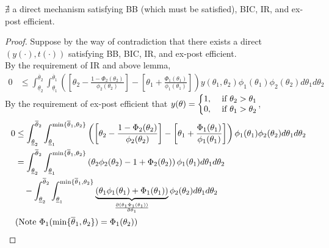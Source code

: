 \documentclass[11pt]{elegantbook}
\begin{document}
\begin{theorem}
    $\nexists$ a direct mechanism satisfying BB (which must be satisfied), BIC, IR, and ex-post efficient.
\end{theorem}
\begin{proof}
    Suppose by the way of contradiction that there exists a direct $(y(\cdot),t(\cdot))$ satisfying BB, BIC, IR, and ex-post efficient.\\
    By the requirement of IR and above lemma,
    \begin{equation}
        \begin{aligned}
            0&\leq \int_{\underline{\theta}_2}^{\overline{\theta}_2}\int_{\underline{\theta}_1}^{\overline{\theta}_1} \left(\left[\theta_2-\frac{1-\Phi_2(\theta_2)}{\phi_2(\theta_2)}\right]-\left[\theta_1+\frac{\Phi_1(\theta_1)}{\phi_1(\theta_1)}\right]\right)y(\theta_1,\theta_2)\phi_1(\theta_1)\phi_2(\theta_2)d\theta_1d\theta_2
        \end{aligned}
        \nonumber
    \end{equation}
    By the requirement of ex-post efficient that $y(\theta)=\left\{\begin{matrix}
        1,& \textnormal{ if }\theta_2>\theta_1\\
        0,& \textnormal{ if }\theta_1>\theta_2
    \end{matrix}\right.$,
    \begin{equation}
        \begin{aligned}
            0&\leq \int_{\underline{\theta}_2}^{\overline{\theta}_2}\int_{\underline{\theta}_1}^{\min\{\overline{\theta}_1,\theta_2\}} \left(\left[\theta_2-\frac{1-\Phi_2(\theta_2)}{\phi_2(\theta_2)}\right]-\left[\theta_1+\frac{\Phi_1(\theta_1)}{\phi_1(\theta_1)}\right]\right)\phi_1(\theta_1)\phi_2(\theta_2)d\theta_1d\theta_2\\
            &=\int_{\underline{\theta}_2}^{\overline{\theta}_2}\int_{\underline{\theta}_1}^{\min\{\overline{\theta}_1,\theta_2\}} \left(\theta_2\phi_2(\theta_2)-1+\Phi_2(\theta_2)\right)\phi_1(\theta_1)d\theta_1d\theta_2\\
            &\quad -\int_{\underline{\theta}_2}^{\overline{\theta}_2}\int_{\underline{\theta}_1}^{\min\{\overline{\theta}_1,\theta_2\}}\underbrace{\left(\theta_1\phi_1(\theta_1)+\Phi_1(\theta_1)\right)}_{\frac{\partial (\theta_1\Phi_1(\theta_1))}{\partial \theta_1}}\phi_2(\theta_2)d\theta_1d\theta_2\\
            &\textnormal{(Note $\Phi_1(\min\{\overline{\theta}_1,\theta_2\})=\Phi_1(\theta_2)$)}\\

\end{aligned}
\end{equation}
\end{proof}
\end{document}

